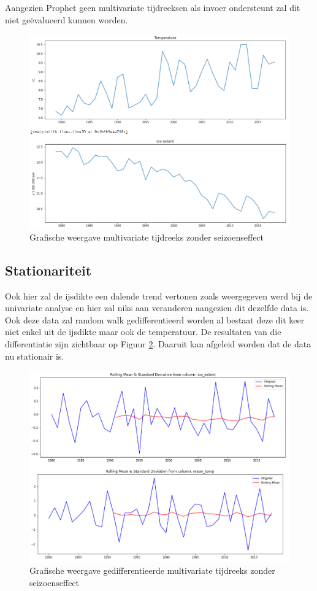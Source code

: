 Aangezien Prophet geen multivariate tijdreeksen als invoer ondersteunt zal dit niet ge\"{e}valueerd kunnen worden.

\begin{figure}[!h]
    \centering
    \caption{Grafische weergave multivariate tijdreeks zonder seizoenseffect}
    \label{fig:mvnsdata}
    \includegraphics[width=1\linewidth]{mv_ns_data}
\end{figure}

\subsection{Stationariteit}

Ook hier zal de ijsdikte een dalende trend vertonen zoals weergegeven werd bij de univariate analyse en hier zal niks aan veranderen aangezien dit dezelfde data is. Ook deze data zal random walk gedifferentieerd worden al bestaat deze dit keer niet enkel uit de ijsdikte maar ook de temperatuur. De resultaten van die differentiatie zijn zichtbaar op Figuur \ref{fig:mvnsdatadiff}. Daaruit kan afgeleid worden dat de data nu stationair is.

\begin{figure}[!h]
    \centering
    \caption{Grafische weergave gedifferentieerde multivariate tijdreeks zonder seizoenseffect}
    \label{fig:mvnsdatadiff}
    \includegraphics[width=1\linewidth]{mv_ns_data_diff}
\end{figure}

